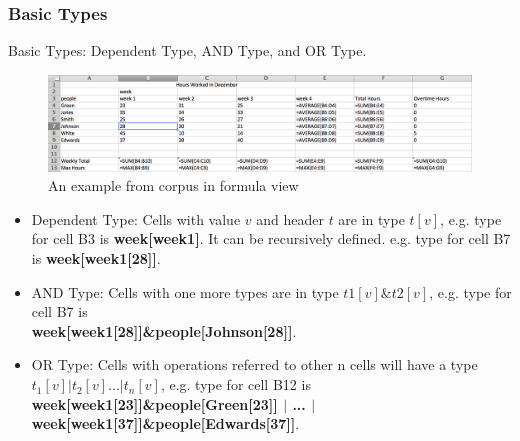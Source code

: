 \documentclass[a4paper]{article}
\begin{document}
\subsubsection{Basic Types}
Basic Types: Dependent Type, AND Type, and OR Type.
\begin{figure}[!tb]
\centering
\includegraphics[width=1\columnwidth]{formula.png}
\caption{An example from corpus in formula view}
\label{sheet}
\end{figure}

\begin{itemize}
\item Dependent Type: Cells with value $v$ and header $t$ are in type $t[v]$, e.g. type for cell B3 is \textbf{week[week1]}. It can be recursively defined. e.g. type for cell B7 is \textbf{week[week1[28]]}. 
\item AND Type: Cells with one more types are in type $t1[v]\&t2[v]$, e.g. type for cell B7 is \\
\textbf{week[week1[28]]\&people[Johnson[28]]}.
\item OR Type: Cells with operations referred to other n cells will have a type $t_1[v]|t_2[v]...|t_n[v]$, e.g. type for cell B12 is \\
\textbf{week[week1[23]]\&people[Green[23]] $|$ ... $|$ week[week1[37]]\&people[Edwards[37]]}.
\end{itemize}
\end{document}
